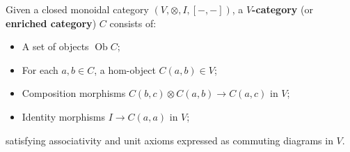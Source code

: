 Given a closed monoidal category $(V, \otimes, I, [-, -])$, a \textbf{$V$-category} (or \textbf{enriched category}) $C$ consists of:
\begin{itemize}
\item A set of objects $\operatorname{Ob}C$;
\item For each $a, b \in C$, a hom-object $C(a, b) \in V$;
\item Composition morphisms $C(b, c) \otimes C(a, b) \rightarrow C(a, c)$ in $V$;
\item Identity morphisms $I \rightarrow C(a, a)$ in $V$;
\end{itemize}
satisfying associativity and unit axioms expressed as commuting diagrams in $V$.
